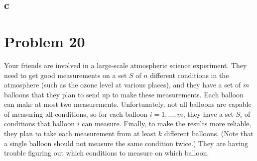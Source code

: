 \documentclass{amsart}
\theoremstyle{definition}
\theoremstyle{remark}
\numberwithin{equation}{section}
\begin{document}
\begin{center}
\end{center}

\subsection*{c}
\section{Problem 20}
Your friends are involved in a large-scale atmospheric science experiment. They need to get good measurements on a set $S$ of $n$ different conditions in the atmosphere (such as the ozone level at various places), and they have a set of $m$ balloons that they plan to send up to make these measurements. Each balloon can make at most two measurements.
Unfortunately, not all balloons are capable of measuring all conditions, so for each balloon $i = 1, \ldots , m$, they have a set $S_i$ of conditions that balloon $i$ can measure. Finally, to make the results more reliable, they plan to take each measurement from at least $k$ different balloons. (Note that a single balloon should not measure the same condition twice.) They are having trouble figuring out which conditions to measure on which balloon.
\end{document}
